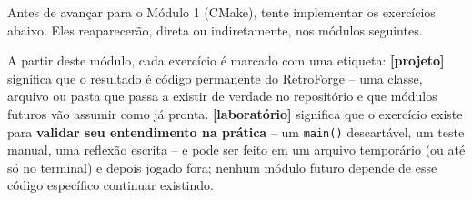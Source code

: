 \begin{CaixaDesafio}
Antes de avançar para o Módulo 1 (CMake), tente implementar os exercícios abaixo. Eles reaparecerão, direta ou indiretamente, nos módulos seguintes.

A partir deste módulo, cada exercício é marcado com uma etiqueta:
\textbf{[projeto]} significa que o resultado é código permanente do RetroForge -- uma classe, arquivo ou pasta que passa a existir de verdade no repositório e que módulos futuros vão assumir como já pronta.
\textbf{[laboratório]} significa que o exercício existe para \textbf{validar seu entendimento na prática} -- um \texttt{main()} descartável, um teste manual, uma reflexão escrita -- e pode ser feito em um arquivo temporário (ou até só no terminal) e depois jogado fora; nenhum módulo futuro depende de esse código específico continuar existindo.


\end{CaixaDesafio}
